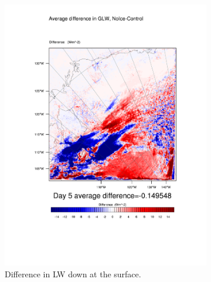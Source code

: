 \begin{figure}
	\begin{subfigure}{0.48\textwidth}
		\centering
		\includegraphics[width=\textwidth]{results/noice/diff_NoIce_GLW_Day5.pdf}
		\caption{Difference in LW down at the surface.}
		\label{subfig:glw_r2Day5}
	\end{subfigure}
	\quad
	\begin{subfigure}{0.48\textwidth}
		\centering

\end{subfigure}
\end{figure}
